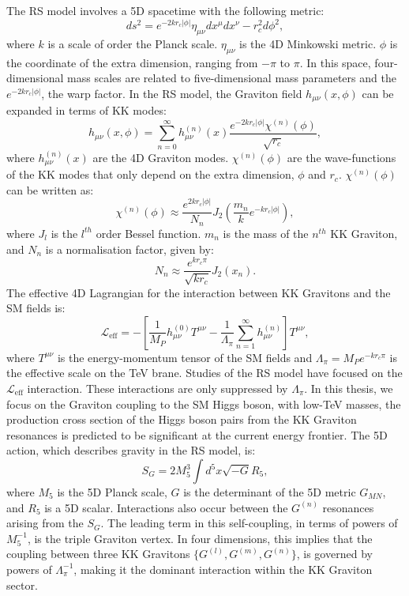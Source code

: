         The RS model involves a 5D spacetime with the following metric:
        \[
        ds^2 = e^{-2kr_c|\phi|} \eta_{\mu\nu} dx^\mu dx^\nu - r_c^2 d\phi^2,
        \]
        where \( k \) is a scale of order the Planck scale. 
        \(\eta_{\mu\nu}\) is the 4D Minkowski metric. 
        \(\phi\) is the coordinate of the extra dimension, ranging from \(-\pi\) to \(\pi\).
        In this space, four-dimensional mass scales are related to five-dimensional mass parameters and the $e^{-2kr_c|\phi|}$, the warp factor.
        In the RS model, the Graviton field \(h_{\mu\nu}(x, \phi)\) can be expanded in terms of KK modes:
        \[
        h_{\mu\nu}(x, \phi) = \sum_{n=0}^{\infty} h_{\mu\nu}^{(n)}(x) \frac{e^{-2kr_c|\phi|}\chi^{(n)}(\phi)}{\sqrt{r_c}},
        \]
        where \(h_{\mu\nu}^{(n)}(x)\) are the 4D Graviton modes. 
        \(\chi^{(n)}(\phi)\) are the wave-functions of the KK modes that only depend on the extra dimension, \(\phi\) and \(r_c\).
        \(\chi^{(n)}(\phi)\) can be written as:
        \[
            \chi^{(n)}(\phi) \approx \frac{e^{2kr_c|\phi|}}{N_n}J_2\left(\frac{m_n}{k} e^{-kr_c|\phi|}\right),
        \]
        where $J_l$ is the $l^{th}$ order Bessel function. $m_n$ is the mass of the $n^{th}$ KK Graviton,
        and $N_n$ is a normalisation factor, given by:
        \[
            N_n \approx \frac{e^{kr_c\pi}}{\sqrt{kr_c}} J_2(x_n).
        \]
        The effective 4D Lagrangian for the interaction between KK Gravitons and the SM fields is:
        \[
        \mathcal{L}_{\text{eff}} = -[\frac{1}{M_P} h_{\mu\nu}^{(0)} T^{\mu\nu} - \frac{1}{\Lambda_\pi} \sum_{n=1}^{\infty} h_{\mu\nu}^{(n)}] T^{\mu\nu},
        \]
        where \(T^{\mu\nu}\) is the energy-momentum tensor of the SM fields and \(\Lambda_\pi = M_P e^{-kr_c\pi}\) is the effective scale on the TeV brane.
        Studies of the RS model have focused on the $\mathcal{L}_{\text{eff}}$ interaction. These interactions are only suppressed by $\Lambda_\pi$.
        In this thesis, we focus on the Graviton coupling to the SM Higgs boson, with low-TeV masses, the production cross section of the Higgs boson pairs 
        from the KK Graviton resonances is predicted to be significant at the current energy frontier.
        The 5D action, which describes gravity in the RS model, is:
        \[
        S_G = 2M_5^3 \int d^5x \sqrt{-G} R_5,
        \]
        where \(M_5\) is the 5D Planck scale, \(G\) is the determinant of the 5D metric \(G_{MN}\), and \(R_5\) is a 5D scalar.
        Interactions also occur between the \( G^{(n)} \) resonances arising from the \( S_G \). 
        The leading term in this self-coupling, in terms of powers of \( M_5^{-1} \), 
        is the triple Graviton vertex. 
        In four dimensions, this implies that the coupling between three 
        KK Gravitons \( \{ G^{(l)}, G^{(m)}, G^{(n)} \} \), 
        is governed by powers of \( \Lambda_\pi^{-1} \), 
        making it the dominant interaction within the KK Graviton sector.
    
